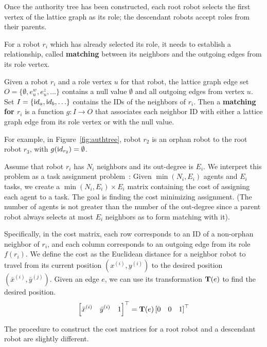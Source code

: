 Once the authority tree has been constructed, each root robot selects the first vertex of the lattice graph as its role; the descendant robots accept roles from their parents.

For a robot $r_i$ which has already selected its role, it needs to establish a
relationship, called \textbf{matching} between its neighbors and the outgoing edges from its role vertex. 
\begin{defn}
\label{def:matching}
  Given a robot $r_i$ and a role vertex $u$ for that robot, the lattice
  graph edge set
    $O=\{\emptyset, e_{u}^w, e_{u}^z, \ldots\}$
  contains a null value $\emptyset$ and all outgoing edges from vertex $u$.  
  Set
    $I=\{{\textrm id}_a, {\textrm id}_b, \ldots \}$
  contains the IDs of the neighbors of $r_i$.  
  Then a
  \textbf{matching for $r_i$} is a function $g : I \rightarrow O$ that
  associates each neighbor ID with either a lattice graph edge from its role vertex or with the null value.
\end{defn}

For example, in Figure~\ref{fig:authtree}, robot $r_2$ is an orphan robot to the root robot $r_3$, with $g({\textrm id}_{r_2}) = \emptyset$.

Assume that robot $r_i$ has $N_i$ neighbors and its out-degree is $E_i$. 
%
We interpret this problem as a task assignment problem~\cite{Kuh55, Mun57}: 
Given $\min(N_i, E_i)$ agents and $E_i$ tasks, we create a $\min(N_i, E_i)\times E_i$ matrix containing the cost of assigning each agent to a task. 
%
The goal is finding the cost minimizing assignment. 
%
(The number of agents is not greater than the number of
the out-degree since a parent robot always selects at most $E_i$ neighbors as to form matching with it).

Specifically, in the cost matrix, each row corresponds to an ID of a non-orphan neighbor of $r_i$, and each column corresponds to an outgoing edge from its role $f(r_i)$. 
%
We define the cost as the Euclidean distance for a neighbor robot to
travel from its current position $(x^{(i)}, y^{(i)})$ to the desired
position $(\bar{x}^{(i)}, \bar{y}^{(j)})$. 
%
Given an edge $e$, we can use its transformation $\mathbf{T}(e)$ to find the desired position.
\begin{equation}
  \label{eq:trans-pos}
  \left[\bar{x}^{(i)} \quad \bar{y}^{(i)} \quad 1\right]^\top = \mathbf{T}(e) \left[0 \quad 0 \quad 1\right]^\top
\end{equation}

The procedure to construct the cost matrices for a root robot and a descendant robot are slightly different.

